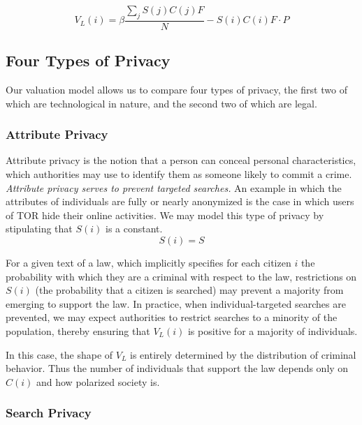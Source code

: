 $$V_L(i) = \beta \frac{\sum_j S(j)C(j)F}{N} - S(i)C(i)F\cdot P$$


\subsection{Four Types of Privacy}
Our valuation model allows us to compare four types of privacy, the first two of which are technological in nature, and the second  two of which are legal.

\subsubsection{Attribute Privacy}

Attribute privacy is the notion that a person can conceal personal characteristics, which authorities may use to identify them as someone likely to commit a crime. \emph{Attribute privacy serves to prevent targeted searches.}  An example in which the attributes of individuals are fully or nearly anonymized is the case in which users of TOR hide their online activities. We may model this type of privacy by stipulating that $S(i)$ is a constant.
$$S(i)=S$$

For a given text of a law, which implicitly specifies for each citizen $i$ the probability with which they are a criminal with respect to the law, restrictions on $S(i)$ (the probability that a citizen is searched) may prevent a majority from emerging to support the law.  %
 In practice, when individual-targeted searches are prevented, we may expect authorities to restrict searches to a minority of the population, thereby ensuring that $V_L(i)$ is positive for a majority of individuals.

In this case, the shape of $V_L$ is entirely determined by the distribution of criminal behavior. Thus the number of individuals that support the law depends only on $C(i)$ and how polarized society is.

\subsubsection{Search Privacy}

